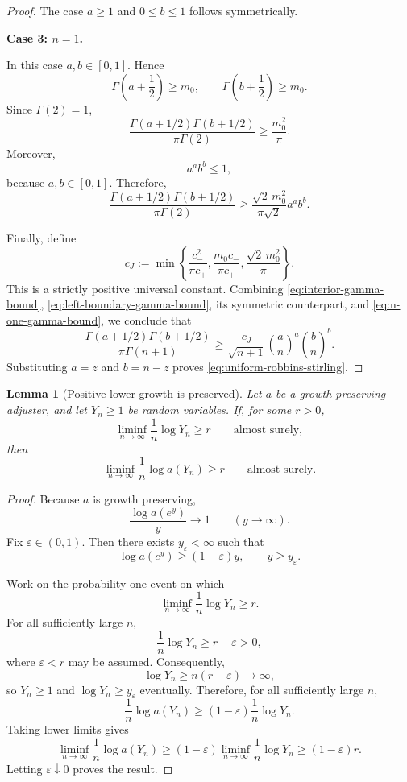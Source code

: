 \documentclass[12pt]{article}
\theoremstyle{spaced}
\newtheorem{lemma}[lemma]{Lemma}
\theoremstyle{remark}
\begin{document}
\begin{proof}
The case \(a\ge1\) and \(0\le b\le1\) follows symmetrically.

\medskip
\noindent
\textbf{Case 3: \(n=1\).}

In this case \(a,b\in[0,1]\). Hence
\[
    \Gamma\left(a+\frac12\right)\ge m_0,
    \qquad
    \Gamma\left(b+\frac12\right)\ge m_0.
\]
Since \(\Gamma(2)=1\),
\[
\frac{
    \Gamma(a+1/2)\Gamma(b+1/2)
}{
    \pi\Gamma(2)
}
\ge
\frac{m_0^2}{\pi}.
\]
Moreover,
\[
    a^ab^b\le1,
\]
because \(a,b\in[0,1]\). Therefore,
\begin{equation}
\label{eq:n-one-gamma-bound}
\frac{
    \Gamma(a+1/2)\Gamma(b+1/2)
}{
    \pi\Gamma(2)
}
\ge
\frac{\sqrt2\,m_0^2}{\pi\sqrt{2}}
a^ab^b.
\end{equation}

Finally, define
\[
c_J
:=
\min\left\{
    \frac{c_-^2}{\pi c_+},
    \frac{m_0c_-}{\pi c_+},
    \frac{\sqrt2\,m_0^2}{\pi}
\right\}.
\]
This is a strictly positive universal constant. Combining
\eqref{eq:interior-gamma-bound},
\eqref{eq:left-boundary-gamma-bound}, its symmetric counterpart, and
\eqref{eq:n-one-gamma-bound}, we conclude that
\[
\frac{
    \Gamma(a+1/2)\Gamma(b+1/2)
}{
    \pi\Gamma(n+1)
}
\ge
\frac{c_J}{\sqrt{n+1}}
\left(\frac an\right)^a
\left(\frac bn\right)^b.
\]
Substituting \(a=z\) and \(b=n-z\) proves
\eqref{eq:uniform-robbins-stirling}.
\end{proof}



\begin{lemma}[Positive lower growth is preserved]
\label{lem:growth-preserved}
Let \(a\) be a growth-preserving adjuster, and let \(Y_n\ge1\) be random
variables. If, for some \(r>0\),
\[
    \liminf_{n\to\infty}\frac{1}{n}\log Y_n
    \ge r
    \qquad\text{almost surely},
\]
then 
\[
    \liminf_{n\to\infty}\frac{1}{n}\log a(Y_n)
    \ge r
    \qquad\text{almost surely}.
\]
\end{lemma}
\begin{proof}
Because \(a\) is growth preserving,
\[
    \frac{\log a(e^y)}{y}\longrightarrow1
    \qquad (y\to\infty).
\]
Fix \(\varepsilon\in(0,1)\). Then there exists \(y_\varepsilon<\infty\)
such that
\[
    \log a(e^y)\ge(1-\varepsilon)y,
    \qquad y\ge y_\varepsilon.
\]

Work on the probability-one event on which
\[
    \liminf_{n\to\infty}\frac{1}{n}\log Y_n\ge r.
\]
For all sufficiently large \(n\),
\[
    \frac{1}{n}\log Y_n\ge r-\varepsilon>0,
\]
where \(\varepsilon<r\) may be assumed. Consequently,
\[
    \log Y_n\ge n(r-\varepsilon)\longrightarrow\infty,
\]
so \(Y_n\ge1\) and \(\log Y_n\ge y_\varepsilon\) eventually. Therefore,
for all sufficiently large \(n\),
\[
    \frac{1}{n}\log a(Y_n)
    \ge
    (1-\varepsilon)\frac{1}{n}\log Y_n.
\]
Taking lower limits gives
\[
    \liminf_{n\to\infty}\frac{1}{n}\log a(Y_n)
    \ge
    (1-\varepsilon)
    \liminf_{n\to\infty}\frac{1}{n}\log Y_n
    \ge
    (1-\varepsilon)r.
\]
Letting \(\varepsilon\downarrow0\) proves the result.
\end{proof}
\end{document}
